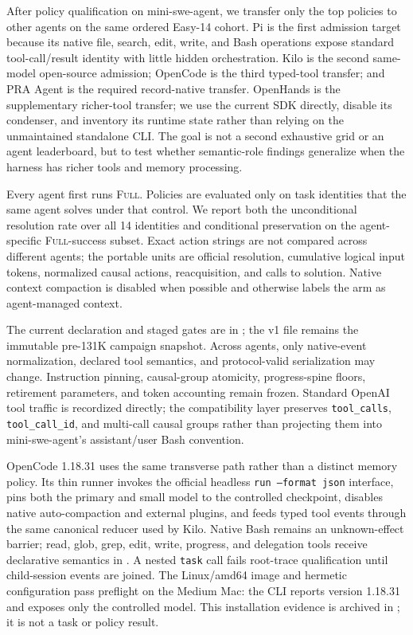 \documentclass[11pt]{article}
\begin{document}
After policy qualification on mini-swe-agent, we transfer only the top policies
to other agents on the same ordered Easy-14 cohort.  Pi is the first admission
target because its native file, search, edit, write, and Bash operations expose
standard tool-call/result identity with little hidden orchestration.  Kilo is
the second same-model open-source admission; OpenCode is the third typed-tool
transfer; and PRA Agent is the required
record-native transfer.  OpenHands is the supplementary richer-tool transfer;
we use the current SDK directly, disable its condenser, and inventory its
runtime state rather than relying on the unmaintained standalone CLI.  The goal is not a
second exhaustive grid or an agent leaderboard, but to test whether
semantic-role findings generalize when the harness has richer tools and memory
processing.

Every agent first runs \textsc{Full}.  Policies are evaluated only on task
identities that the same agent solves under that control.  We report both the
unconditional resolution rate over all 14 identities and conditional
preservation on the agent-specific \textsc{Full}-success subset.  Exact action
strings are not compared across different agents; the portable units are
official resolution, cumulative logical input tokens, normalized causal
actions, reacquisition, and calls to solution.  Native context compaction is
disabled when possible and otherwise labels the arm as agent-managed context.

The current declaration and staged gates are in
; the v1 file remains the immutable
pre-131K campaign snapshot.  Across agents, only native-event
normalization, declared tool semantics, and protocol-valid serialization may
change.  Instruction pinning, causal-group atomicity, progress-spine floors,
retirement parameters, and token accounting remain frozen.  Standard OpenAI
tool traffic is recordized directly; the compatibility layer preserves
\texttt{tool\_calls}, \texttt{tool\_call\_id}, and multi-call causal groups rather
than projecting them into mini-swe-agent's assistant/user Bash convention.

OpenCode 1.18.31 uses the same transverse path rather than a distinct memory
policy.  Its thin runner invokes the official headless
\texttt{run --format json} interface, pins both the primary and small model to
the controlled checkpoint, disables native auto-compaction and external
plugins, and feeds typed tool events through the same canonical reducer used by
Kilo.  Native Bash remains an unknown-effect barrier; read, glob, grep, edit,
write, progress, and delegation tools receive declarative semantics in
.  A nested \texttt{task} call
fails root-trace qualification until child-session events are joined.  The
Linux/amd64 image and hermetic configuration pass preflight on the Medium Mac:
the CLI reports version 1.18.31 and exposes only the controlled model.  This
installation evidence is archived in
; it is not a task
or policy result.
\end{document}
